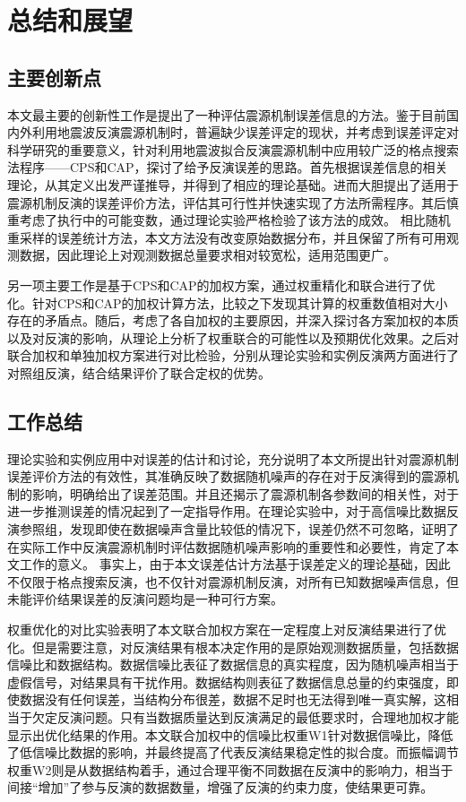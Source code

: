 
\chapter{总结和展望}
\section{主要创新点}
本文最主要的创新性工作是提出了一种评估震源机制误差信息的方法。鉴于目前国内外利用地震波反演震源机制时，普遍缺少误差评定的现状，并考虑到误差评定对科学研究的重要意义，针对利用地震波拟合反演震源机制中应用较广泛的格点搜索法程序——CPS和CAP，探讨了给予反演误差的思路。首先根据误差信息的相关理论，从其定义出发严谨推导，并得到了相应的理论基础。进而大胆提出了适用于震源机制反演的误差评价方法，评估其可行性并快速实现了方法所需程序。其后慎重考虑了执行中的可能变数，通过理论实验严格检验了该方法的成效。
相比随机重采样的误差统计方法，本文方法没有改变原始数据分布，并且保留了所有可用观测数据，因此理论上对观测数据总量要求相对较宽松，适用范围更广。

另一项主要工作是基于CPS和CAP的加权方案，通过权重精化和联合进行了优化。针对CPS和CAP的加权计算方法，比较之下发现其计算的权重数值相对大小存在的矛盾点。随后，考虑了各自加权的主要原因，并深入探讨各方案加权的本质以及对反演的影响，从理论上分析了权重联合的可能性以及预期优化效果。之后对联合加权和单独加权方案进行对比检验，分别从理论实验和实例反演两方面进行了对照组反演，结合结果评价了联合定权的优势。

\section{工作总结}
理论实验和实例应用中对误差的估计和讨论，充分说明了本文所提出针对震源机制误差评价方法的有效性，其准确反映了数据随机噪声的存在对于反演得到的震源机制的影响，明确给出了误差范围。并且还揭示了震源机制各参数间的相关性，对于进一步推测误差的情况起到了一定指导作用。在理论实验中，对于高信噪比数据反演参照组，发现即使在数据噪声含量比较低的情况下，误差仍然不可忽略，证明了在实际工作中反演震源机制时评估数据随机噪声影响的重要性和必要性，肯定了本文工作的意义。
事实上，由于本文误差估计方法基于误差定义的理论基础，因此不仅限于格点搜索反演，也不仅针对震源机制反演，对所有已知数据噪声信息，但未能评价结果误差的反演问题均是一种可行方案。

权重优化的对比实验表明了本文联合加权方案在一定程度上对反演结果进行了优化。但是需要注意，对反演结果有根本决定作用的是原始观测数据质量，包括数据信噪比和数据结构。数据信噪比表征了数据信息的真实程度，因为随机噪声相当于虚假信号，对结果具有干扰作用。数据结构则表征了数据信息总量的约束强度，即使数据没有任何误差，当结构分布很差，数据不足时也无法得到唯一真实解，这相当于欠定反演问题。只有当数据质量达到反演满足的最低要求时，合理地加权才能显示出优化结果的作用。本文联合加权中的信噪比权重W1针对数据信噪比，降低了低信噪比数据的影响，并最终提高了代表反演结果稳定性的拟合度。而振幅调节权重W2则是从数据结构着手，通过合理平衡不同数据在反演中的影响力，相当于间接“增加”了参与反演的数据数量，增强了反演的约束力度，使结果更可靠。

